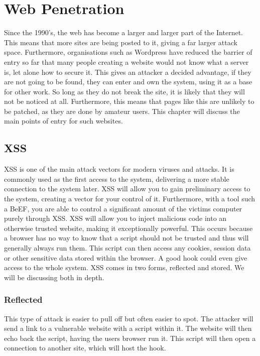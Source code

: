 \chapter{Web Penetration}
	\label{ch:WebPenetration}
	Since the 1990's, the web has become a larger and larger part of the Internet.
	This means that more sites are being posted to it, giving a far larger attack space.
	Furthermore, organisations such as Wordpress have reduced the barrier of entry so far that many people creating a website would not know what a server is, let alone how to secure it.
	This gives an attacker a decided advantage, if they are not going to be found,
	they can enter and own the system, using it as a base for other work.
	So long as they do not break the site, it is likely that they will not be noticed at all.
	Furthermore, this means that pages like this are unlikely to be patched, as they are done by amateur users.
	This chapter will discuss the main points of entry for such websites.

	\section{XSS}
		XSS is one of the main attack vectors for modern viruses and attacks.
		It is commonly used as the first access to the system, delivering a more stable connection to the system later.
		XSS will allow you to gain preliminary access to the system, creating a vector for your control of it.
		Furthermore, with a tool such a BeEF, you are able to control a significant amount of the victims computer purely through XSS.
		XSS will allow you to inject malicious code into an otherwise trusted website, making it exceptionally powerful.
		This occurs because a browser has no way to know that a script should not be trusted and thus will generally always run them.
		This script can then access any cookies, session data or other sensitive data stored within the browser.
		A good hook could even give access to the whole system.
		XSS comes in two forms, reflected and stored.
		We will be discussing both in depth.
		\subsection{Reflected}
			This type of attack is easier to pull off but often easier to spot.
			The attacker will send a link to a vulnerable website with a script within it.
			The website will then echo back the script, having the users browser run it.
			This script will then open a connection to another site, which will host the hook.

